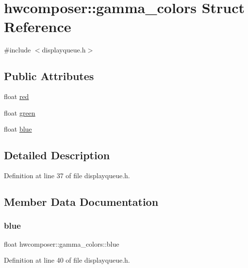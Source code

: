 \hypertarget{structhwcomposer_1_1gamma__colors}{}\section{hwcomposer\+:\+:gamma\+\_\+colors Struct Reference}
\label{structhwcomposer_1_1gamma__colors}


{\ttfamily \#include $<$displayqueue.\+h$>$}

\subsection*{Public Attributes}
\begin{DoxyCompactItemize}
\item 
float \mbox{\hyperlink{structhwcomposer_1_1gamma__colors_a02c6848074b1bf52bedf0a97a791fbbd}{red}}
\item 
float \mbox{\hyperlink{structhwcomposer_1_1gamma__colors_a920b8cb1cd029474bbbcbfae61d0feb2}{green}}
\item 
float \mbox{\hyperlink{structhwcomposer_1_1gamma__colors_a3e2055501bf5bd0be915deb952f26097}{blue}}
\end{DoxyCompactItemize}


\subsection{Detailed Description}


Definition at line 37 of file displayqueue.\+h.



\subsection{Member Data Documentation}
\mbox{\label{structhwcomposer_1_1gamma__colors_a3e2055501bf5bd0be915deb952f26097}} 
\subsubsection{\texorpdfstring{blue}{blue}}
{\footnotesize\ttfamily float hwcomposer\+::gamma\+\_\+colors\+::blue}



Definition at line 40 of file displayqueue.\+h.


